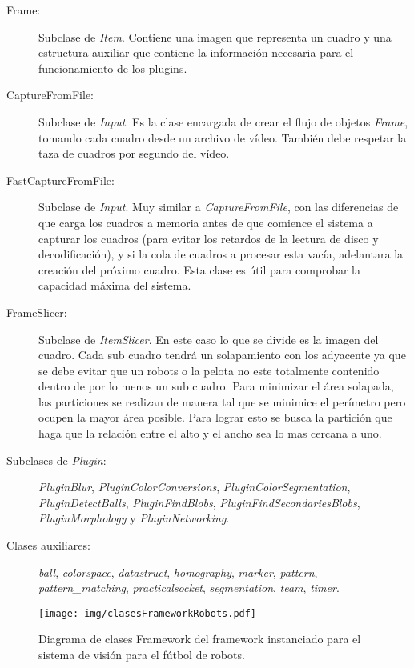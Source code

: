 \begin{description}

\item[Frame:] Subclase de \emph{Item}. Contiene una imagen que representa un
	cuadro y una estructura auxiliar que contiene la información necesaria
	para el funcionamiento de los plugins.

\item[CaptureFromFile:] Subclase de \emph{Input}. Es la clase encargada de crear
	el flujo de objetos \emph{Frame}, tomando cada cuadro desde un archivo
	de vídeo. También debe respetar la taza de cuadros por segundo del
	vídeo.

\item[FastCaptureFromFile:] Subclase de \emph{Input}. Muy similar a
	\emph{CaptureFromFile}, con las diferencias de que carga los cuadros a
	memoria antes de que comience el sistema a capturar los cuadros (para
	evitar los retardos de la lectura de disco y decodificación), y si la
	cola de cuadros a procesar esta vacía, adelantara la creación del
	próximo cuadro. Esta clase es útil para comprobar la capacidad máxima
	del sistema.

\item[FrameSlicer:] Subclase de \emph{ItemSlicer}. En este caso lo que se divide
	es la imagen del cuadro. Cada sub cuadro tendrá un solapamiento con los
	adyacente ya que se debe evitar que un robots o la pelota no este
	totalmente contenido dentro de por lo menos un sub cuadro. Para
	minimizar el área solapada, las particiones se realizan de manera tal
	que se minimice el perímetro pero ocupen la mayor área posible. Para
	lograr esto se busca la partición que haga que la relación entre el alto
	y el ancho sea lo mas cercana a uno.

\item[Subclases de \emph{Plugin}:] \emph{PluginBlur},
	\emph{PluginColorConversions}, \emph{PluginColorSegmentation},
	\emph{PluginDetectBalls}, \emph{PluginFindBlobs},
	\emph{PluginFindSecondariesBlobs}, \emph{PluginMorphology} y
	\emph{PluginNetworking}.

\item[Clases auxiliares:] \emph{ball}, \emph{colorspace}, \emph{datastruct},
	\emph{homography}, \emph{marker}, \emph{pattern},
	\emph{pattern\_matching}, \emph{practicalsocket}, \emph{segmentation},
	\emph{team}, \emph{timer}.

\end{description}

\begin{figure}[h]

	\texttt{[image: img/clasesFrameworkRobots.pdf]}

	\caption{Diagrama de clases Framework del framework instanciado para el
	sistema de visión para el fútbol de robots.}

\end{figure}

